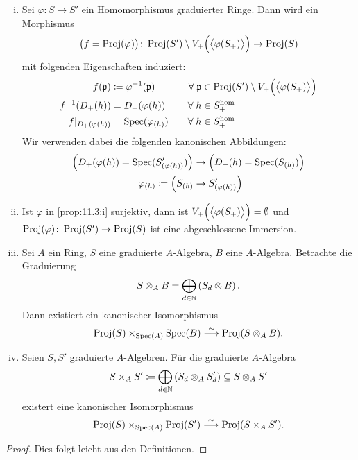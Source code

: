 \begin{prop}
	\label{prop:11.3}
	\begin{enumerate}[i)]
		\item\label{prop:11.3:i} Sei $\varphi \colon S \to S'$ ein Homomorphismus graduierter Ringe. Dann wird ein Morphismus
		\[
			\bigl(f = \operatorname{Proj}(\varphi)\bigr) \colon \operatorname{Proj}(S') \setminus V_+\Bigl(\big\langle\varphi(S_+)\big\rangle\Bigr) \to \operatorname{Proj}(S)
		\]
		mit folgenden Eigenschaften induziert:
		\begin{alignat*}{2}
			f(\mathfrak{p}) &\coloneqq \varphi^{-1}(\mathfrak{p}) \quad & \forall \;\mathfrak{p} &\in \operatorname{Proj}(S') \setminus V_+\Bigl(\big\langle\varphi(S_+)\big\rangle\Bigr) \\
			f^{-1} (D_+(h)) &= D_+(\varphi(h))\quad & \forall \;h &\in S_+^{\text{hom}} \\
			f|_{D_+(\varphi(h))} &= \operatorname{Spec}(\varphi_{(h)})\quad & \forall\; h &\in S_+^{\text{hom}}
		\end{alignat*}
		Wir verwenden dabei die folgenden kanonischen Abbildungen:
		\begin{align*}
			\Bigl(D_+(\varphi(h)) = \operatorname{Spec}(S_{(\varphi(h))}')\Bigr) & \to \Bigl(D_+(h) = \operatorname{Spec}(S_{(h)})\Bigr)\\
			\varphi_{(h)} \coloneqq \Bigl(S_{(h)} & \to S_{(\varphi(h))}'\Bigr)
		\end{align*}
		\item\label{prop:11.3:ii} Ist $\varphi$ in \ref{prop:11.3:i} surjektiv, dann ist $V_+\Bigl(\big\langle\varphi(S_+)\big\rangle\Bigr) = \emptyset$ und $\operatorname{Proj}(\varphi)\colon\operatorname{Proj}(S') \to \operatorname{Proj}(S)$ ist eine abgeschlossene Immersion.
		\item\label{prop:11.3:iii} Sei $A$ ein Ring, $S$ eine graduierte $A$-Algebra, $B$ eine $A$-Algebra. Betrachte die Graduierung
		\[
			S \otimes_A B = \bigoplus_{d\in \mathbb {N}} \left( S_d \otimes B \right).
		\]
		Dann existiert ein kanonischer Isomorphismus
		\[
			\operatorname{Proj}(S) \times_{\operatorname{Spec}(A)} \operatorname{Spec}(B) \overset{\sim}{\longrightarrow} \operatorname{Proj}(S \otimes_A B).
		\]
		\item\label{prop:11.3:iv} Seien $S,S'$ graduierte $A$-Algebren. Für die graduierte $A$-Algebra
		\[
			S \times_A S' \coloneqq \bigoplus_{d\in\mathbb {N}} \left( S_d \otimes_A S_d' \right) \subseteq S \otimes_A S'
		\]
		existert eine kanonischer Isomorphismus
		\[
			\operatorname{Proj}(S) \times_{\operatorname{Spec}(A)} \operatorname{Proj}(S') \overset{\sim}{\longrightarrow} \operatorname{Proj}(S \times_A S').
		\]
	\end{enumerate}
	
	\begin{proof}
		Dies folgt leicht aus den Definitionen.
	\end{proof}
\end{prop}

